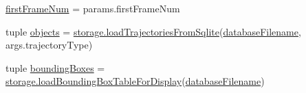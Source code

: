 \begin{DoxyCompactItemize}
\item 
\hyperlink{namespacedisplay-trajectories_aee5d40a05c18b868da1967c3f7b96047}{first\-Frame\-Num} = params.\-first\-Frame\-Num
\item 
tuple \hyperlink{namespacedisplay-trajectories_a010c5bc128d9c1d72f41939d06616bbf}{objects} = \hyperlink{namespacestorage_aaafba9f6bc0816ff0084df5e1d892a9d}{storage.\-load\-Trajectories\-From\-Sqlite}(\hyperlink{namespacedisplay-trajectories_a43b07df78fee39f08977f07a606d4b32}{database\-Filename}, args.\-trajectory\-Type)
\item 
tuple \hyperlink{namespacedisplay-trajectories_a006e51ba4b107177564f50f940d5f87d}{bounding\-Boxes} = \hyperlink{namespacestorage_a651d604c13f73a8d00f8848f2b376d90}{storage.\-load\-Bounding\-Box\-Table\-For\-Display}(\hyperlink{namespacedisplay-trajectories_a43b07df78fee39f08977f07a606d4b32}{database\-Filename})
\end{DoxyCompactItemize}


